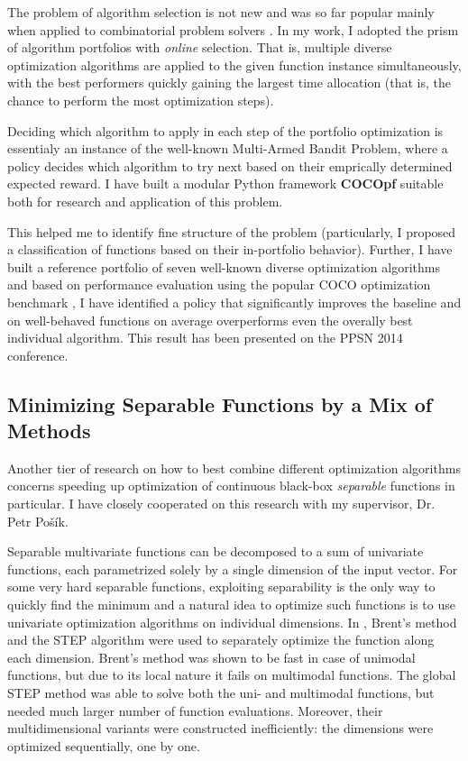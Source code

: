 The problem of algorithm selection is not new \cite{Rice}
and was so far popular mainly when applied to
combinatorial problem solvers \cite{combpfsurvey}.
In my work, I adopted the prism of algorithm portfolios \cite{algportfolios}
with \textit{online} selection.
That is, multiple diverse optimization algorithms are applied
to the given function instance simultaneously, with the best
performers quickly gaining the largest time allocation (that is,
the chance to perform the most optimization steps).

Deciding which algorithm to apply in each step of the portfolio
optimization is essentialy an instance of the well-known Multi-Armed
Bandit Problem, where a policy decides which algorithm to try next
based on their emprically determined expected reward.
I have built a modular Python framework \textbf{COCOpf} \cite{COCOpf}
suitable both for research and application of this problem.

This helped me to identify fine structure of the problem
(particularly, I proposed a classification of functions based on
their in-portfolio behavior).
Further, I have built a reference portfolio of seven well-known
diverse optimization algorithms and based on performance evaluation
using the popular COCO optimization benchmark \cite{COCO1}, I have
identified a policy that significantly improves the baseline and
on well-behaved functions on average overperforms even the overally
best individual algorithm. This result has been presented on the
PPSN 2014 conference. \cite{optpf}

\subsection{Minimizing Separable Functions by a Mix of Methods}

Another tier of research on how to best combine different optimization
algorithms concerns speeding up optimization of continuous black-box
\textit{separable} functions in particular.  I have closely cooperated
on this research with my supervisor, Dr. Petr Pošík.

Separable multivariate functions can be decomposed to a sum of univariate
functions, each parametrized solely by a single dimension of the input
vector.
For some very hard separable functions, exploiting separability
is the only way to quickly find the minimum and a natural idea to optimize
such functions is to use univariate optimization algorithms on individual
dimensions.
In \cite{PosikGECCO2009LineSearch}, Brent's method \cite{Brent1973} and the STEP algorithm \cite{STEP} were used to separately optimize the function along each dimension.
Brent's method was shown to be fast in case of unimodal functions, but due to its local nature it fails on multimodal functions.
The global STEP method was able to solve both the uni- and multimodal functions, but needed much larger number of function evaluations.
Moreover, their multidimensional variants were constructed inefficiently: the dimensions were optimized sequentially, one by one.

